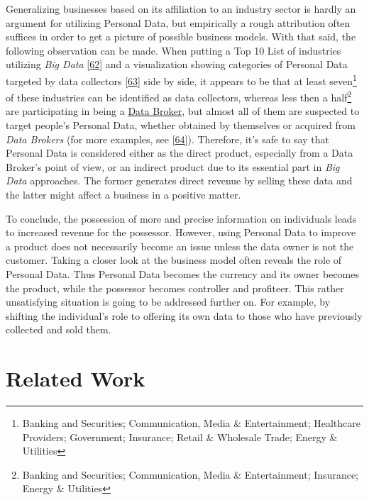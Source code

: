 \documentclass[12pt,english,a4paper,titlepage,cleardoublepage=empty,dottedtoc]{report}
\begin{document}
Generalizing businesses based on its affiliation to an industry sector
is hardly an argument for utilizing Personal Data, but empirically a
rough attribution often suffices in order to get a picture of possible
business models. With that said, the following observation can be made.
When putting a Top 10 List of industries utilizing \emph{Big Data}
{[}\protect\hyperlink{ref-graphic_2015_applications-of-big-data-in-10-industry-verticals}{62}{]}
and a visualization showing categories of Personal Data targeted by data
collectors
{[}\protect\hyperlink{ref-graphic_2012_personal-data-ecosystem}{63}{]}
side by side, it appears to be that at least seven\footnote{Banking and
  Securities; Communication, Media \& Entertainment; Healthcare
  Providers; Government; Insurance; Retail \& Wholesale Trade; Energy \&
  Utilities} of these industries can be identified as data collectors,
whereas less then a half\footnote{Banking and Securities; Communication,
  Media \& Entertainment; Insurance; Energy \& Utilities} are
participating in being a
\protect\hyperlink{terminologies--data-broker}{Data Broker}, but almost
all of them are suspected to target people's Personal Data, whether
obtained by themselves or acquired from \emph{Data Brokers} (for more
examples, see
{[}\protect\hyperlink{ref-video_2016_corporate-surveillance-digital-tracking-big-data-privacy}{64}{]}).
Therefore, it's safe to say that Personal Data is considered either as
the direct product, especially from a Data Broker's point of view, or an
indirect product due to its essential part in \emph{Big Data}
approaches. The former generates direct revenue by selling these data
and the latter might affect a business in a positive matter.

To conclude, the possession of more and precise information on
individuals leads to increased revenue for the possessor. However, using
Personal Data to improve a product does not necessarily become an issue
unless the data owner is not the customer. Taking a closer look at the
business model often reveals the role of Personal Data. Thus Personal
Data becomes the currency and its owner becomes the product, while the
possessor becomes controller and profiteer. This rather unsatisfying
situation is going to be addressed further on. For example, by shifting
the individual's role to offering its own data to those who have
previously collected and sold them.

\hypertarget{related-work}{\section{Related Work}\label{related-work}}
\end{document}
